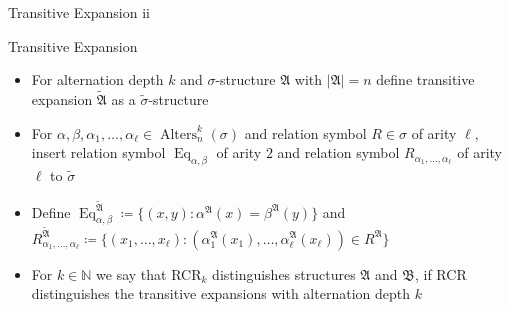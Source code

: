 \documentclass[aspectratio=169]{beamer}
\begin{document}
	\begin{frame}{Transitive Expansion ii}
		\begin{block}{Transitive Expansion}
			\begin{itemize}
				\item For alternation depth $k$ and $\sigma$-structure $\mathfrak A$ with $\vert \mathfrak A\vert = n$ define transitive expansion $\widetilde{\mathfrak A}$ as a $\widetilde{\sigma}$-structure
				\item For $\alpha,\beta,\alpha_1,\dots,\alpha_\ell\in \operatorname{Alters}^k_n(\sigma)$ and relation symbol $R\in\sigma$ of arity $\ell$, insert relation symbol $\operatorname{Eq}_{\alpha,\beta}$ of arity $2$ and relation symbol $R_{\alpha_1,\dots,\alpha_\ell}$ of arity $\ell$ to $\widetilde{\sigma}$
				\item Define $\operatorname{Eq}_{\alpha,\beta}^{\widetilde{\mathfrak A}}\coloneqq \{(x,y) : \alpha^{\mathfrak A}(x)=\beta^{\mathfrak A}(y)\}$ and $R_{\alpha_1,\dots,\alpha_\ell}^{\widetilde{\mathfrak A}}\coloneqq \{(x_1,\dots,x_\ell) : (\alpha_1^{\mathfrak A}(x_1),\dots,\alpha_\ell^{\mathfrak A}(x_\ell))\in R^{\mathfrak A}\}$
			\end{itemize}
		\end{block}
		\begin{itemize}
			\item For $k\in\mathbb N$ we say that RCR$_k$ distinguishes structures $\mathfrak A$ and $\mathfrak B$, if RCR distinguishes the transitive expansions with alternation depth $k$
		\end{itemize}
	\end{frame}
	
\end{document}
